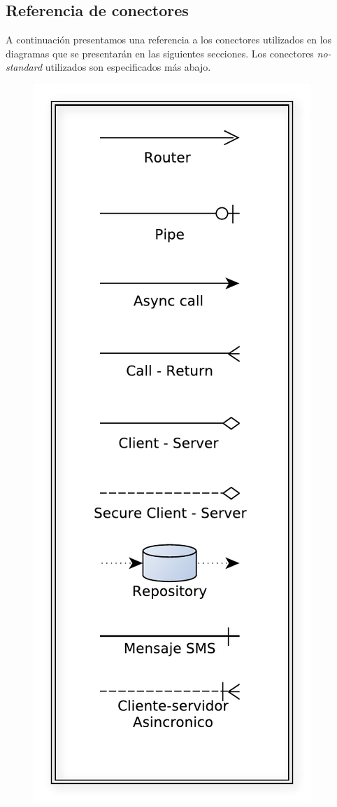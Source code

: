 \newcommand{\nota}[1]{
  $\bullet$ {\color{red}{#1}}
}

\subsection{Referencia de conectores}
A continuación presentamos una referencia a los conectores utilizados en los diagramas que se presentarán en las siguientes secciones. Los conectores \emph{no-standard} utilizados son especificados más abajo.

\begin{multicols}{2}
\begin{figure}[H]
	\centering
	\includegraphics[scale=0.6]{graficos/call_reference.pdf}

\end{figure}
\end{multicols}
